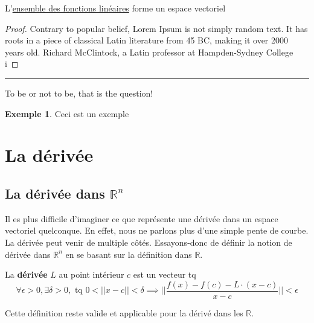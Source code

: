 \documentclass[12pt]{report}
\let\Bbb\mathbb
\newcommand\todo[1]{\phantom{#1}}
\theoremstyle{definition}
\newtheorem*{example}{Exemple}
\newenvironment{preuve}{\renewcommand{\proofname}{Preuve}\begin{proof}}{\end{proof}\noindent\textcolor[RGB]{220,220,220}{\rule{\textwidth}{1pt}}}
\begin{document}
    \begin{prop}
        \label{thm:ensemble_fonctions_lineaires_espace_Vectoriels}
        L'\hyperref[def:ensemble_fonctions_lineaires]{ensemble des fonctions linéaires} forme un espace vectoriel \todo{Add link here}
    \end{prop}
    \begin{preuve}
        Contrary to popular belief, Lorem Ipsum is not simply random text. 
        It has roots in a piece of classical Latin literature from 45 BC, 
        making it over 2000 years old. Richard McClintock, a Latin professor at Hampden-Sydney College i
    \end{preuve}

    \begin{attention}
        To be or not to be, that is the question!
    \end{attention}


    \begin{example}
        Ceci est un exemple
    \end{example}
\chapter{La dérivée}
\section{La dérivée dans $\Bbb R^n$}
    Il es plus difficile d'imaginer ce que représente une dérivée dans un espace vectoriel 
    quelconque. En effet, nous ne parlons plus d'une simple pente de courbe. La dérivée
    peut venir de multiple côtés. Essayons-donc de définir la notion de dérivée dans $\Bbb R^n$
    en se basant sur la définition dans $\Bbb R$.
    \begin{defi}[Dérivée de $\Bbb R^n \mapsto \Bbb R^n$]
        \label{def:derivee_rn}

        La \textbf{dérivée} $L$ au point intérieur $c$ est un vecteur tq 
        $$ \forall \epsilon > 0, \exists \delta > 0, \text{ tq } 0 < ||x - c|| < \delta \implies  \big| \big| \frac{f(x) - f(c) - L\cdot(x - c)}{x - c} \big|\big|< \epsilon $$
    \end{defi}
    \begin{attention}
        Cette définition reste valide et applicable pour la dérivé dans les $\Bbb R$.
    \end{attention}
\end{document}
